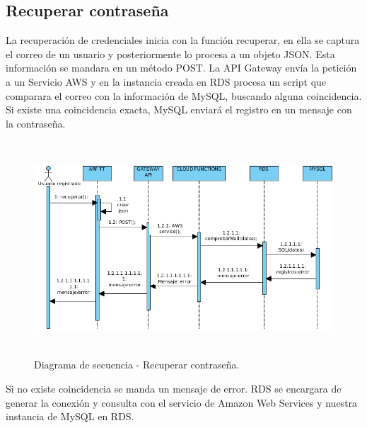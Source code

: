 \subsection{Recuperar contraseña}\par
La recuperación de credenciales inicia con la función recuperar, en ella se captura el correo de un usuario y posteriormente lo procesa a un objeto JSON. Esta información se mandara en un método POST. La API Gateway envía la petición a un Servicio AWS y en la instancia creada en RDS procesa un script que comparara el correo con la  información de MySQL, buscando alguna coincidencia. Si existe una coincidencia exacta, MySQL enviará el registro en un mensaje con la contraseña.
\vspace{5mm}
\begin{figure}[h!]
	\centering
	\includegraphics[width=14cm,height=8cm]{imagenes/analisis/DSrecuperarContra.jpg}
	\caption{Diagrama de secuencia - Recuperar contraseña.}
	\label{fig:analogo}
\end{figure}
\vspace{5mm} \par
Si no existe coincidencia se manda un mensaje de error. RDS se encargara de generar la conexión y consulta con el servicio de Amazon Web Services y nuestra instancia de MySQL en RDS.
\newpage
